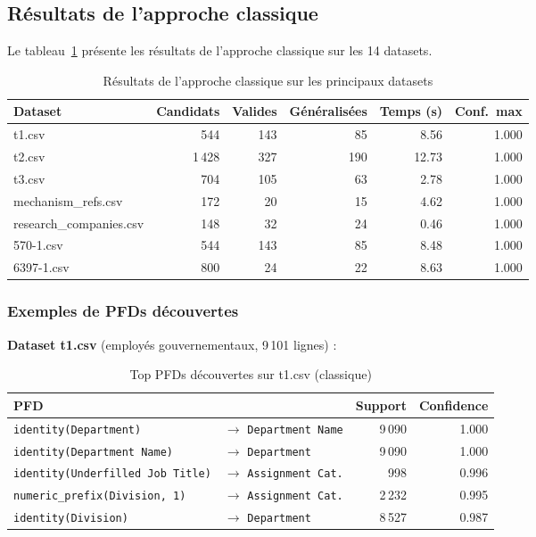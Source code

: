 \documentclass[12pt,a4paper]{article}
\begin{document}
\subsection{R\'{e}sultats de l'approche classique}

Le tableau~\ref{tab:classical_results} pr\'{e}sente les r\'{e}sultats de l'approche classique sur les 14 datasets.

\begin{table}[H]
\centering
\caption{R\'{e}sultats de l'approche classique sur les principaux datasets}
\label{tab:classical_results}
\small
\begin{tabular}{@{}lrrrrr@{}}
\toprule
\textbf{Dataset} & \textbf{Candidats} & \textbf{Valides} & \textbf{G\'{e}n\'{e}ralis\'{e}es} & \textbf{Temps (s)} & \textbf{Conf.\ max} \\
\midrule
t1.csv & 544 & 143 & 85 & 8.56 & 1.000 \\
t2.csv & 1\,428 & 327 & 190 & 12.73 & 1.000 \\
t3.csv & 704 & 105 & 63 & 2.78 & 1.000 \\
mechanism\_refs.csv & 172 & 20 & 15 & 4.62 & 1.000 \\
research\_companies.csv & 148 & 32 & 24 & 0.46 & 1.000 \\
570-1.csv & 544 & 143 & 85 & 8.48 & 1.000 \\
6397-1.csv & 800 & 24 & 22 & 8.63 & 1.000 \\
\bottomrule
\end{tabular}
\end{table}

\subsubsection{Exemples de PFDs d\'{e}couvertes}

\textbf{Dataset t1.csv} (employ\'{e}s gouvernementaux, 9\,101 lignes) :

\begin{table}[H]
\centering
\caption{Top PFDs d\'{e}couvertes sur t1.csv (classique)}
\label{tab:pfds_t1}
\begin{tabular}{@{}llrr@{}}
\toprule
\textbf{PFD} & & \textbf{Support} & \textbf{Confidence} \\
\midrule
\texttt{identity(Department)} & $\rightarrow$ \texttt{Department Name} & 9\,090 & 1.000 \\
\texttt{identity(Department Name)} & $\rightarrow$ \texttt{Department} & 9\,090 & 1.000 \\
\texttt{identity(Underfilled Job Title)} & $\rightarrow$ \texttt{Assignment Cat.} & 998 & 0.996 \\
\texttt{numeric\_prefix(Division, 1)} & $\rightarrow$ \texttt{Assignment Cat.} & 2\,232 & 0.995 \\
\texttt{identity(Division)} & $\rightarrow$ \texttt{Department} & 8\,527 & 0.987 \\
\bottomrule
\end{tabular}
\end{table}
\end{document}
